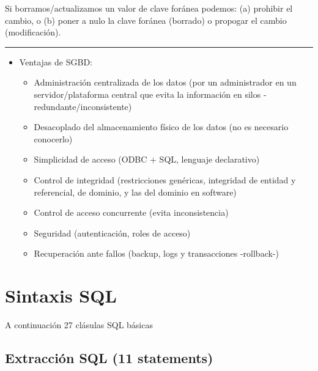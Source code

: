 \documentclass[]{book}
\providecommand{\tightlist}{%
  \setlength{\itemsep}{0pt}\setlength{\parskip}{0pt}}
\begin{document}
Si borramos/actualizamos un valor de clave foránea podemos: (a) prohibir
el cambio, o (b) poner a nulo la clave foránea (borrado) o propogar el
cambio (modificación).

\begin{center}\rule{0.5\linewidth}{\linethickness}\end{center}

\begin{itemize}
\tightlist
\item
  Ventajas de SGBD:

  \begin{itemize}
  \tightlist
  \item
    Administración centralizada de los datos (por un administrador en un
    servidor/plataforma central que evita la información en silos
    -redundante/inconsistente)
  \item
    Desacoplado del almacenamiento físico de los datos (no es necesario
    conocerlo)
  \item
    Simplicidad de acceso (ODBC + SQL, lenguaje declarativo)
  \item
    Control de integridad (restricciones genéricas, integridad de
    entidad y referencial, de dominio, y las del dominio en software)
  \item
    Control de acceso concurrente (evita inconsistencia)
  \item
    Seguridad (autenticación, roles de acceso)
  \item
    Recuperación ante fallos (backup, logs y transacciones -rollback-)
  \end{itemize}
\end{itemize}

\section{Sintaxis SQL}\label{sintaxis-sql}

A continuación 27 clásulas SQL básicas

\subsection{Extracción SQL (11
statements)}\label{extraccion-sql-11-statements}
\end{document}
